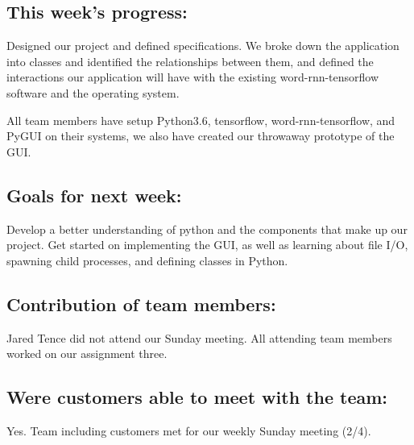 \documentclass[12pt]{article}
\begin{document}
\subsection{This week's progress:}
Designed our project and defined specifications. We broke down the application into classes and identified the relationships between them, and defined the interactions our application will have with the existing word-rnn-tensorflow software and the operating system.

All team members have setup Python3.6, tensorflow, word-rnn-tensorflow, and PyGUI on their systems, we also have created our throwaway prototype of the GUI.

\subsection{Goals for next week:}
Develop a better understanding of python and the components that make up our project. Get started on implementing the GUI, as well as learning about file I/O, spawning child processes, and defining classes in Python.

\subsection{Contribution of team members:}
Jared Tence did not attend our Sunday meeting.
All attending team members worked on our assignment three.

\subsection{Were customers able to meet with the team:}
Yes. Team including customers met for our weekly Sunday meeting (2/4).
\end{document}
